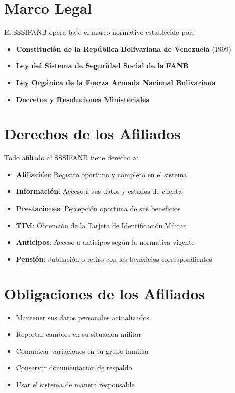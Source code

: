 \section*{Marco Legal}

El SSSIFANB opera bajo el marco normativo establecido por:

\begin{itemize}[leftmargin=*]
    \item \textbf{Constitución de la República Bolivariana de Venezuela} (1999)
    \item \textbf{Ley del Sistema de Seguridad Social de la FANB}
    \item \textbf{Ley Orgánica de la Fuerza Armada Nacional Bolivariana}
    \item \textbf{Decretos y Resoluciones Ministeriales}
\end{itemize}

\section*{Derechos de los Afiliados}

Todo afiliado al SSSIFANB tiene derecho a:

\begin{itemize}[leftmargin=*]
    \item \textbf{Afiliación}: Registro oportuno y completo en el sistema
    \item \textbf{Información}: Acceso a sus datos y estados de cuenta
    \item \textbf{Prestaciones}: Percepción oportuna de sus beneficios
    \item \textbf{TIM}: Obtención de la Tarjeta de Identificación Militar
    \item \textbf{Anticipos}: Acceso a anticipos según la normativa vigente
    \item \textbf{Pensión}: Jubilación o retiro con los beneficios correspondientes
\end{itemize}

\section*{Obligaciones de los Afiliados}

\begin{itemize}[leftmargin=*]
    \item Mantener sus datos personales actualizados
    \item Reportar cambios en su situación militar
    \item Comunicar variaciones en su grupo familiar
    \item Conservar documentación de respaldo
    \item Usar el sistema de manera responsable
\end{itemize}

